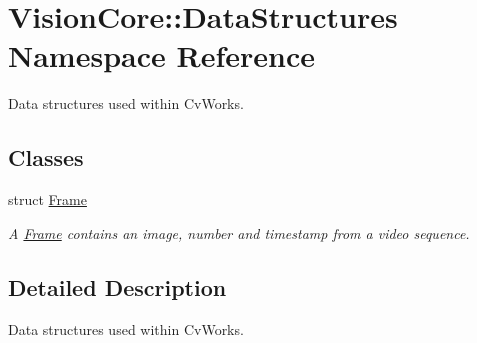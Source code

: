 \hypertarget{namespace_vision_core_1_1_data_structures}{}\section{Vision\+Core\+:\+:Data\+Structures Namespace Reference}
\label{namespace_vision_core_1_1_data_structures}


Data structures used within Cv\+Works.  


\subsection*{Classes}
\begin{DoxyCompactItemize}
\item 
struct \hyperlink{struct_vision_core_1_1_data_structures_1_1_frame}{Frame}
\begin{DoxyCompactList}\small\item\em A \hyperlink{struct_vision_core_1_1_data_structures_1_1_frame}{Frame} contains an image, number and timestamp from a video sequence. \end{DoxyCompactList}\end{DoxyCompactItemize}


\subsection{Detailed Description}
Data structures used within Cv\+Works. 